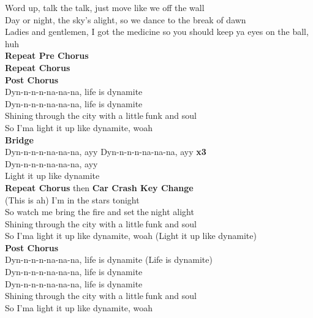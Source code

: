 Word up, talk the talk, just move like we off the wall\\
Day or night, the sky's alight, so we dance to the break of dawn\\
Ladies and gentlemen, I got the medicine so you should keep ya eyes on the ball, huh\\
\textbf{Repeat Pre Chorus}\\
\textbf{Repeat Chorus}\\
\textbf{Post Chorus}\\
Dyn-n-n-n-na-na-na, life is dynamite\\
Dyn-n-n-n-na-na-na, life is dynamite\\
Shining through the city with a little funk and soul\\
So I'ma light it up like dynamite, woah\\
\textbf{Bridge}\\
Dyn-n-n-n-na-na-na, ayy Dyn-n-n-n-na-na-na, ayy  \textbf{x3}\\
Dyn-n-n-n-na-na-na, ayy\\
Light it up like dynamite\\
\textbf{Repeat Chorus} then \textbf{Car Crash Key Change}\\
(This is ah) I'm in the stars tonight \\
So watch me bring the fire and set the night alight\\
Shining through the city with a little funk and soul\\
So I'ma light it up like dynamite, woah (Light it up like dynamite)\\
\textbf{Post Chorus}\\
Dyn-n-n-n-na-na-na, life is dynamite (Life is dynamite)\\
Dyn-n-n-n-na-na-na, life is dynamite\\
Dyn-n-n-n-na-na-na, life is dynamite\\
Shining through the city with a little funk and soul\\
So I'ma light it up like dynamite, woah\\




